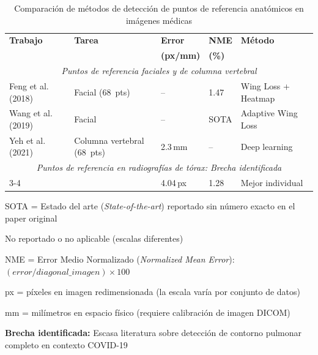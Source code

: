 
\begin{table}[htbp]
\centering
\begin{threeparttable}
\caption{Comparación de métodos de detección de puntos de referencia anatómicos en imágenes médicas}
\label{tab:landmark_detection_comparison}
\small
\setlength{\tabcolsep}{2.5pt}
\begin{tabular}{@{}p{3.5cm}p{2.2cm}p{2.0cm}p{1.3cm}p{3.0cm}@{}}
\toprule
\textbf{Trabajo} & \textbf{Tarea} & \textbf{Error} & \textbf{NME} & \textbf{Método} \\
 & & \textbf{(px/mm)} & \textbf{(\%)} & \\
\midrule
\multicolumn{5}{c}{\textit{Puntos de referencia faciales y de columna vertebral}} \\
\midrule
Feng et al. (2018) \cite{feng2018wing} & Facial (68~pts) & -- & 1.47 & Wing Loss + Heatmap \\
Wang et al. (2019) & Facial & -- & SOTA\tnote{a} & Adaptive Wing Loss \\
Yeh et al. (2021) \cite{yeh2021deep} & Columna vertebral (68~pts) & 2.3\,mm & -- & Deep learning \\
\midrule
\multicolumn{5}{c}{\textit{Puntos de referencia en radiografías de tórax: Brecha identificada}} \\
\midrule
\cmidrule{3-4}
 & & 4.04\,px\tnote{b} & 1.28 & Mejor individual \\
\bottomrule
\end{tabular}
\begin{tablenotes}
\footnotesize
\item[a] SOTA = Estado del arte (\textit{State-of-the-art}) reportado sin número exacto en el paper original
\item[--] No reportado o no aplicable (escalas diferentes)
\item NME = Error Medio Normalizado (\textit{Normalized Mean Error}): $(error / diagonal\_imagen) \times 100$
\item px = píxeles en imagen redimensionada (la escala varía por conjunto de datos)
\item mm = milímetros en espacio físico (requiere calibración de imagen DICOM)
\item \textbf{Brecha identificada:} Escasa literatura sobre detección de contorno pulmonar completo en contexto COVID-19
\end{tablenotes}
\end{threeparttable}
\end{table}
